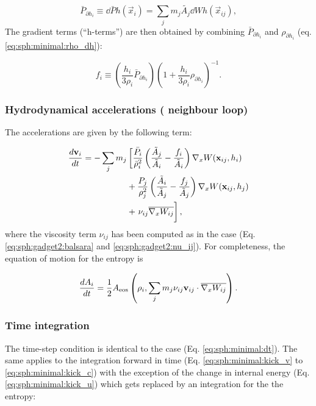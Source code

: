 \begin{equation}
\bar P_{\partial h_i} \equiv \dd{\bar{P}}{h}(\vec{x}_i) = \sum_j m_j
\tilde{A_j} \dd{W}{h}(\vec{x}_{ij}), \label{eq:sph:pe:P_dh}
\end{equation}
The gradient terms (``h-terms'') are then obtained by combining $\bar
P_{\partial h_i}$ and $\rho_{\partial h_i}$
(eq. \ref{eq:sph:minimal:rho_dh}):

\begin{equation}
  f_i \equiv \left(\frac{h_i}{3\rho_i}\bar P_{\partial
    h_i}\right)\left(1 + \frac{h_i}{3\rho_i}\rho_{\partial
    h_i}\right)^{-1}. 
\end{equation}

\subsubsection{Hydrodynamical accelerations ( neighbour loop)}

The accelerations are given by the following term:

\begin{align}
  \frac{d{\mathbf{v}}_i}{dt} = -\sum_j m_j &\left[\frac{\bar P_i}{\bar\rho_i^2} \left(\frac{\tilde A_j}{\tilde A_i} - \frac{f_i}{\tilde A_i}\right)\nabla_x W({\mathbf{x}}_{ij}, h_i) \right.  \nonumber \\
  &+\frac{P_j}{\rho_j^2} \left(\frac{\tilde A_i}{\tilde A_j} - \frac{f_j}{\tilde A_j}\right)\nabla_x W({\mathbf{x}}_{ij},h_j) \\
  &+ \left. \bigg.\nu_{ij} \overline{\nabla_xW_{ij}} \right], \label{eq:sph:pe:dv_dt}
\end{align}
where the viscosity term $\nu_{ij}$ has been computed as in
the \GadgetSPH case (Eq. \ref{eq:sph:gadget2:balsara}
and \ref{eq:sph:gadget2:nu_ij}). For completeness, the equation of
motion for the entropy is

\begin{equation}
\frac{dA_i}{dt} = \frac{1}{2} A_{\rm eos}\left(\rho_i, \sum_j
m_j \nu_{ij}{\mathbf{v}}_{ij}\cdot \overline{\nabla_xW_{ij}}\right).
\end{equation}

\subsubsection{Time integration}

The time-step condition is identical to the \MinimalSPH case
(Eq. \ref{eq:sph:minimal:dt}). The same applies to the integration
forward in time (Eq. \ref{eq:sph:minimal:kick_v} to
\ref{eq:sph:minimal:kick_c}) with the exception of the change in
internal energy (Eq. \ref{eq:sph:minimal:kick_u}) which gets replaced
by an integration for the the entropy:

